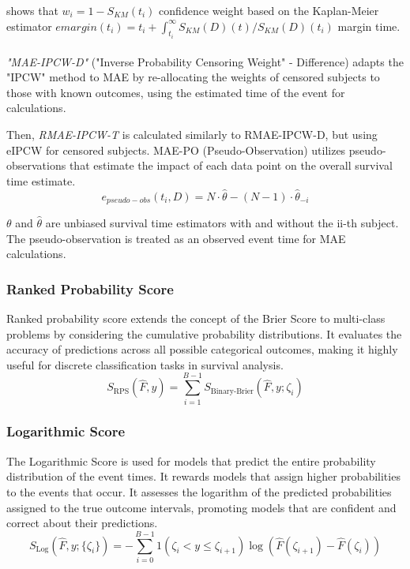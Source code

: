 \noindent \parencite{qi_effective_2023} shows that \(w_{i} = 1-S_{KM}(t_{i})\) confidence weight based on the Kaplan-Meier estimator \(emargin(t_{i})=t_{i}+\int_{t_{i}}^{\infty} S_{KM}(D)(t)/S_{KM}(D)(t_{i})\) margin time.
\\\\
\noindent \textit{"MAE-IPCW-D"} ("Inverse Probability Censoring Weight" - Difference) adapts the "IPCW" method to MAE by re-allocating the weights of censored subjects to those with known outcomes, using the estimated time of the event for calculations.
\par \noindent Then, \textit{RMAE-IPCW-T} is calculated similarly to RMAE-IPCW-D, but using eIPCW  for censored subjects. MAE-PO (Pseudo-Observation) utilizes pseudo-observations that estimate the impact of each data point on the overall survival time estimate. 
\begin{equation} \label{eq:maepsuedo}e_{pseudo-obs}(t_i, D) = N \cdot \hat{\theta} - (N - 1) \cdot \hat{\theta}_{-i}\end{equation}
\par \noindent \(\theta\) and \(\hat{\theta}\) are unbiased survival time estimators with and without the ii-th subject. The pseudo-observation is treated as an observed event time for MAE calculations.

\subsubsection*{Ranked Probability Score}
Ranked probability score \parencite{yanagisawa_proper_2023} extends the concept of the Brier Score to multi-class problems by considering the cumulative probability distributions. It evaluates the accuracy of predictions across all possible categorical outcomes, making it highly useful for discrete classification tasks in survival analysis.
\begin{equation} \label{eq:ranked}S_{\text{RPS}}(\hat{F}, y) = \sum_{i=1}^{B-1} S_{\text{Binary-Brier}}(\hat{F}, y; \zeta_i)\end{equation}

\subsubsection*{Logarithmic Score}
The Logarithmic Score \parencite{yanagisawa_proper_2023} is used for models that predict the entire probability distribution of the event times. It rewards models that assign higher probabilities to the events that occur. It assesses the logarithm of the predicted probabilities assigned to the true outcome intervals, promoting models that are confident and correct about their predictions.
\begin{equation} \label{eq:logscore}S_{\text{Log}}(\hat{F}, y; \{\zeta_i\}) = -\sum_{i=0}^{B-1} 1(\zeta_i < y \leq \zeta_{i+1}) \log(\hat{F}(\zeta_{i+1}) - \hat{F}(\zeta_i))\end{equation}

